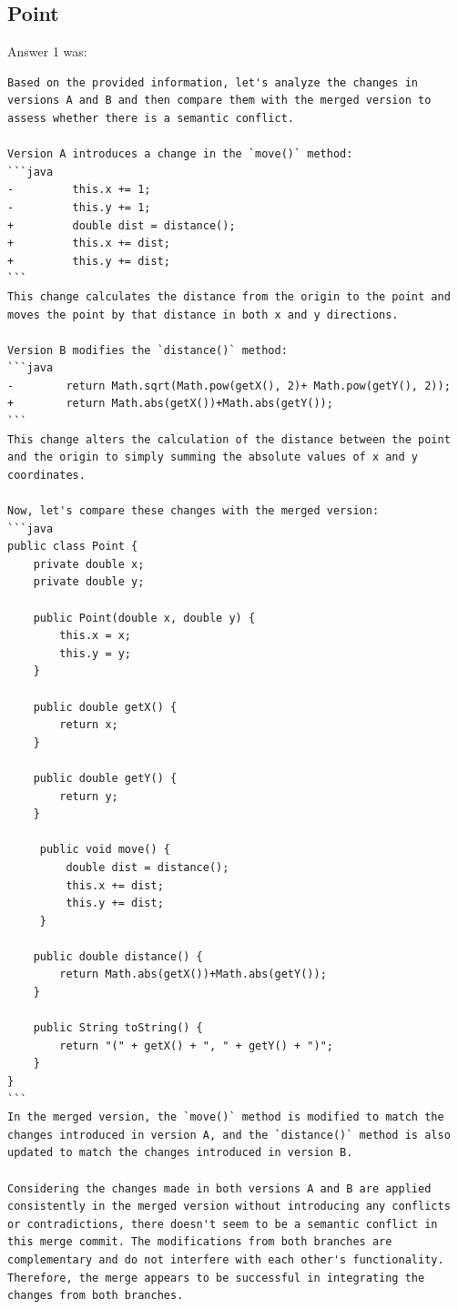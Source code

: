 \subsection{Point}

Answer 1 was:
\begin{lstlisting}
Based on the provided information, let's analyze the changes in versions A and B and then compare them with the merged version to assess whether there is a semantic conflict.

Version A introduces a change in the `move()` method:
```java
-         this.x += 1;
-         this.y += 1;
+         double dist = distance();
+         this.x += dist;
+         this.y += dist;
```
This change calculates the distance from the origin to the point and moves the point by that distance in both x and y directions.

Version B modifies the `distance()` method:
```java
-        return Math.sqrt(Math.pow(getX(), 2)+ Math.pow(getY(), 2));
+        return Math.abs(getX())+Math.abs(getY());
```
This change alters the calculation of the distance between the point and the origin to simply summing the absolute values of x and y coordinates.

Now, let's compare these changes with the merged version:
```java
public class Point {
    private double x;
    private double y;

    public Point(double x, double y) {
        this.x = x;
        this.y = y;
    }

    public double getX() {
        return x;
    }

    public double getY() {
        return y;
    }

     public void move() {
         double dist = distance();
         this.x += dist;
         this.y += dist;
     }

    public double distance() {
        return Math.abs(getX())+Math.abs(getY());
    }

    public String toString() {
        return "(" + getX() + ", " + getY() + ")";
    }
}
```
In the merged version, the `move()` method is modified to match the changes introduced in version A, and the `distance()` method is also updated to match the changes introduced in version B.

Considering the changes made in both versions A and B are applied consistently in the merged version without introducing any conflicts or contradictions, there doesn't seem to be a semantic conflict in this merge commit. The modifications from both branches are complementary and do not interfere with each other's functionality. Therefore, the merge appears to be successful in integrating the changes from both branches.
\end{lstlisting}


